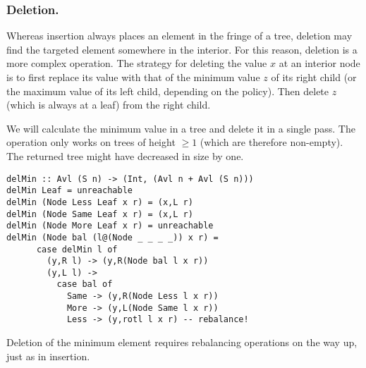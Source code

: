 
\subsubsection{Deletion.}

Whereas insertion always places an element in the fringe of a 
tree, deletion may find the targeted element somewhere in the interior.
For this reason, deletion is a more complex operation.  The strategy for 
deleting the value $x$ at an interior node is to first replace its value with 
that of the minimum value $z$ of its right child (or the maximum value of its
left child, depending on the policy).  Then delete $z$ (which is always at a leaf) 
from the right child.

We will calculate the minimum value in a tree and delete it in a single pass.
The operation only works on trees of height $\geq 1$ (which are therefore
non-empty).  The returned tree might have decreased in size by one.

{\small
\begin{verbatim}
delMin :: Avl (S n) -> (Int, (Avl n + Avl (S n)))
delMin Leaf = unreachable
delMin (Node Less Leaf x r) = (x,L r)
delMin (Node Same Leaf x r) = (x,L r)
delMin (Node More Leaf x r) = unreachable
delMin (Node bal (l@(Node _ _ _ _)) x r) =
      case delMin l of
        (y,R l) -> (y,R(Node bal l x r))
        (y,L l) ->
          case bal of
            Same -> (y,R(Node Less l x r))
            More -> (y,L(Node Same l x r))
            Less -> (y,rotl l x r) -- rebalance!
\end{verbatim}
}
\noindent
Deletion of the minimum element requires rebalancing operations on the way 
up, just as in insertion.

